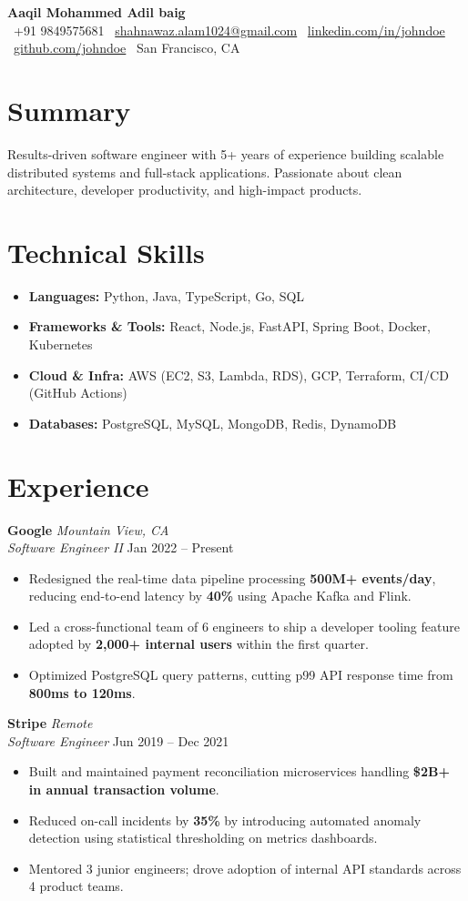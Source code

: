 \documentclass[10pt, letterpaper]{article}
\newcommand{\resumename}[1]{%
  {\Huge\bfseries #1}\\[4pt]
}
\newcommand{\contactinfo}[5]{%
  \small
  \faPhone\ #1 \quad
  \faEnvelope\ \href{mailto:#2}{#2} \quad
  \faLinkedin\ \href{https://linkedin.com/in/#3}{linkedin.com/in/#3} \quad
  \faGithub\ \href{https://github.com/#4}{github.com/#4} \quad
  \faMapMarker*\ #5
  \\[2pt]
}
\newcommand{\jobentry}[4]{%
  \vspace{4pt}
  \textbf{#1} \hfill \textit{#3} \\
  \textit{#2} \hfill \small{#4}
  \vspace{1pt}
}
\begin{document}
\begin{center}
  \resumename{Aaqil Mohammed Adil baig}
  \contactinfo
    {+91 9849575681}
    {shahnawaz.alam1024@gmail.com}
    {johndoe}
    {johndoe}
    {San Francisco, CA}
\end{center}
\section{Summary}
Results-driven software engineer with 5+ years of experience building
scalable distributed systems and full-stack applications. Passionate about
clean architecture, developer productivity, and high-impact products.
\section{Technical Skills}
\begin{itemize}[leftmargin=0in, label={}]
  \item \textbf{Languages:} Python, Java, TypeScript, Go, SQL
  \item \textbf{Frameworks \& Tools:} React, Node.js, FastAPI, Spring Boot, Docker, Kubernetes
  \item \textbf{Cloud \& Infra:} AWS (EC2, S3, Lambda, RDS), GCP, Terraform, CI/CD (GitHub Actions)
  \item \textbf{Databases:} PostgreSQL, MySQL, MongoDB, Redis, DynamoDB
\end{itemize}
\section{Experience}

\jobentry{Google}{Software Engineer II}{Mountain View, CA}{Jan 2022 -- Present}
\begin{itemize}
  \item Redesigned the real-time data pipeline processing \textbf{500M+ events/day}, reducing
        end-to-end latency by \textbf{40\%} using Apache Kafka and Flink.
  \item Led a cross-functional team of 6 engineers to ship a developer tooling feature
        adopted by \textbf{2,000+ internal users} within the first quarter.
  \item Optimized PostgreSQL query patterns, cutting p99 API response time from
        \textbf{800ms to 120ms}.
\end{itemize}

\jobentry{Stripe}{Software Engineer}{Remote}{Jun 2019 -- Dec 2021}
\begin{itemize}
  \item Built and maintained payment reconciliation microservices handling
        \textbf{\$2B+ in annual transaction volume}.
  \item Reduced on-call incidents by \textbf{35\%} by introducing automated anomaly detection
        using statistical thresholding on metrics dashboards.
  \item Mentored 3 junior engineers; drove adoption of internal API standards
        across 4 product teams.
\end{itemize}
\end{document}
